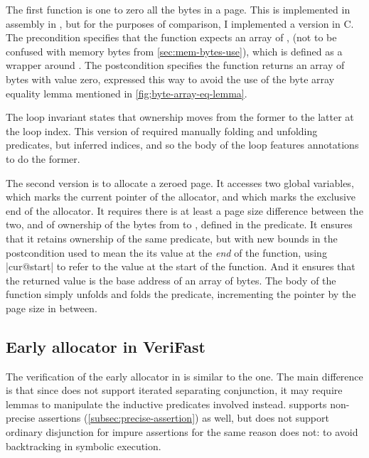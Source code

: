 The first function is one to zero all the bytes in a page. This is implemented
in assembly in , but for the purposes of comparison, I implemented a
version in C. The precondition specifies that the function expects an array of
, (not to be confused with memory bytes from
\cref{sec:mem-bytes-use}), which is defined as a wrapper around
. The postcondition specifies the function returns an
array of bytes with value zero, expressed this way to avoid the use of the byte
array equality lemma mentioned in \cref{fig;byte-array-eq-lemma}.

The loop invariant states that ownership moves from the former to the latter at
the loop index. This version of  required manually folding and unfolding
predicates, but inferred indices, and so the body of the loop features
annotations to do the former.


The second version is to allocate a zeroed page. It accesses two global
variables,  which marks the current pointer of the allocator, and
 which marks the exclusive end of the allocator. It requires there
is at least a page size difference between the two, and of ownership of the
bytes from  to , defined in the 
predicate. It ensures that it retains ownership of the same predicate, but with
new bounds \textemdash{}  in the postcondition used to mean the
its value at the \emph{end} of the function, using \cninline|{cur}@start| to
refer to the value at the start of the function. And it ensures that the
returned value is the base address of an array of bytes. The body of the
function simply unfolds and folds the  predicate,
incrementing the pointer by the page size in between.


\subsection{Early allocator in VeriFast}

The verification of the early allocator in  is similar to the
 one. The main difference is that since  does not support
iterated separating conjunction, it may require lemmas to manipulate the
inductive predicates involved instead.  supports non-precise
assertions (\cref{subsec:precise-assertion}) as well, but does not support
ordinary disjunction for impure assertions for the same reason  does
not: to avoid backtracking in symbolic
execution.

